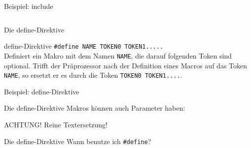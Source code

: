 \begin{frame}{Beispiel: include}
	\footnotesize
	
	
	\begin{columns}
		
	\end{columns}
\end{frame}

\begin{frame}[fragile]{Die define-Direktive}
	\begin{block}{define-Direktive}
		\verb|#define NAME TOKEN0 TOKEN1.....| \\
		\vspace{0.5em}
		Definiert ein Makro mit dem Namen \verb|NAME|, die darauf folgenden Token sind optional. Trifft der Präprozessor nach der Definition eines Macros auf das Token \verb|NAME|, so ersetzt er es durch die Token \verb|TOKEN0 TOKEN1....|.
	\end{block}
\end{frame}

\begin{frame}{Beispiel: define-Direktive}
	\footnotesize
	
\end{frame}

\begin{frame}[fragile]{Die define-Direktive}
	Makros können auch Parameter haben:
	
	\footnotesize
	
	
	\alert{ACHTUNG! Reine Textersetzung!}
\end{frame}

\begin{frame}[fragile]{Die define-Direktive}
	Wann benutze ich \verb|#define|?
	
\end{frame}

